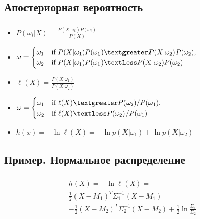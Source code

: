 \documentclass{beamer}
\begin{document}
\subsection{Апостериорная вероятность}

\begin{frame}
  \frametitle{\insertsection}
  \framesubtitle{\insertsubsection}
  
  \begin{itemize}
  \item $\displaystyle P(\omega_i | X) = \frac{P(X | \omega_i) P(\omega_i)}{P(X)} $ \pause
  \item $\displaystyle
    \omega =
    \begin{cases}
      \omega_1 & \text{if } P(X | \omega_1) P(\omega_1) \textgreater P(X | \omega_2) P(\omega_2),\\
      \omega_2 & \text{if } P(X | \omega_1) P(\omega_1) \textless P(X | \omega_2) P(\omega_2)
    \end{cases}$ \pause
  \item $\displaystyle \ell(X) = \frac{P(X | \omega_1)}{P(X | \omega_2)} $
    \pause
  \item $\displaystyle
    \omega =
    \begin{cases}
      \omega_1 & \text{if } \ell(X) \textgreater P(\omega_2) / P(\omega_1),\\
      \omega_2 & \text{if } \ell(X) \textless P(\omega_2) / P(\omega_1)
    \end{cases}$ \pause
  \item $\displaystyle h(x) = -\ln \ell(X) = -\ln p(X | \omega_1) + \ln p(X | \omega_2) $
  \end{itemize}
\end{frame}

\subsection{Пример. Нормальное распределение}

\begin{frame}
  \frametitle{\insertsection}
  \framesubtitle{\insertsubsection}
  
  \begin{multline*}
    h(X) = -\ln \ell(X) =\\
    \frac12 (X - M_1)^T \Sigma_1^{-1}(X - M_1)\\
    - \frac12 (X - M_2)^T \Sigma_2^{-1}(X - M_2) + \frac12 \ln \frac{\Sigma_1}{\Sigma_2}
  \end{multline*}

\end{frame}
\end{document}
